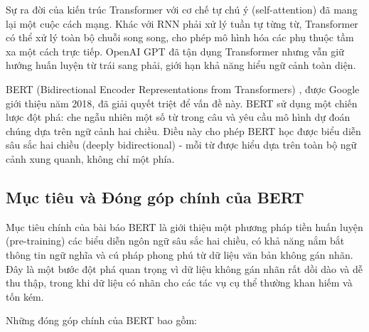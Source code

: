 Sự ra đời của kiến trúc Transformer \cite{vaswani2017attention} với cơ chế tự chú ý (self-attention) đã mang lại một cuộc cách mạng. Khác với RNN phải xử lý tuần tự từng từ, Transformer có thể xử lý toàn bộ chuỗi song song, cho phép mô hình hóa các phụ thuộc tầm xa một cách trực tiếp. OpenAI GPT \cite{radford2018improving} đã tận dụng Transformer nhưng vẫn giữ hướng huấn luyện từ trái sang phải, giới hạn khả năng hiểu ngữ cảnh toàn diện.

BERT (Bidirectional Encoder Representations from Transformers) \cite{devlin2018bert}, được Google giới thiệu năm 2018, đã giải quyết triệt để vấn đề này. BERT sử dụng một chiến lược đột phá: che ngẫu nhiên một số từ trong câu và yêu cầu mô hình dự đoán chúng dựa trên ngữ cảnh hai chiều. Điều này cho phép BERT học được biểu diễn sâu sắc hai chiều (deeply bidirectional) - mỗi từ được hiểu dựa trên toàn bộ ngữ cảnh xung quanh, không chỉ một phía.

\subsection{Mục tiêu và Đóng góp chính của BERT}
\label{ssec:muc_tieu_dong_gop_bert}
Mục tiêu chính của bài báo BERT \cite{devlin2018bert} là giới thiệu một phương pháp tiền huấn luyện (pre-training) các biểu diễn ngôn ngữ sâu sắc hai chiều, có khả năng nắm bắt thông tin ngữ nghĩa và cú pháp phong phú từ dữ liệu văn bản không gán nhãn. Đây là một bước đột phá quan trọng vì dữ liệu không gán nhãn rất dồi dào và dễ thu thập, trong khi dữ liệu có nhãn cho các tác vụ cụ thể thường khan hiếm và tốn kém.

Những đóng góp chính của BERT bao gồm:

